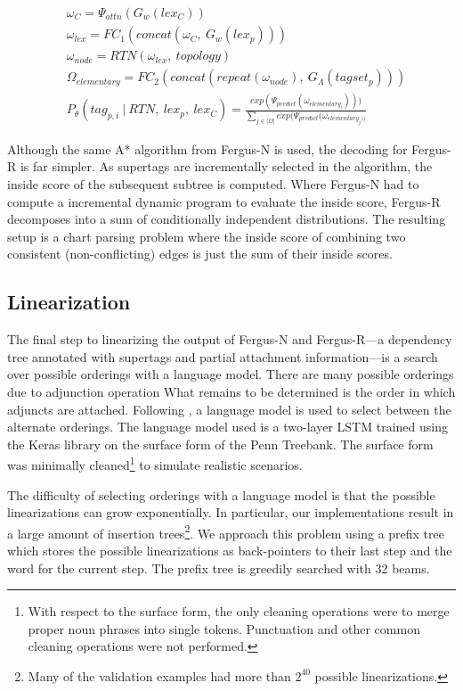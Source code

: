 \documentclass[11pt]{article}
\begin{document}
\begin{align}
&\omega_{C} = \Psi_{attn}(G_w(lex_C)) \label{eq:fergusr} \\
&\omega_{lex} = FC_1(concat(\omega_{C},~G_w(lex_p))) \nonumber \\
&\omega_{node} = RTN(\omega_{lex},~topology) \nonumber \\
&\Omega_{elementary} = FC_2(concat(repeat(\omega_{node}),~G_\Lambda(tagset_p))) \nonumber \\
&P_\theta(tag_{p,i}~|~RTN,~lex_p,~lex_{C}) = 
\frac{exp(\Psi_{predict}(\omega_{elementary_i})))}
{\sum_{j \in |\Omega|} exp(\Psi_{predict}(\omega_{elementary_j))}} \nonumber
\end{align}

Although the same A* algorithm from Fergus-N is used, the decoding for Fergus-R is far simpler.
%
As supertags are incrementally selected in the algorithm, the inside score of the subsequent subtree is computed.  
%
Where Fergus-N had to compute a incremental dynamic program to evaluate the inside score, Fergus-R decomposes into a sum of conditionally independent distributions. 
%
The resulting setup is a chart parsing problem where the inside score of combining two consistent (non-conflicting) edges is just the sum of their inside scores. 

\subsection{Linearization}

The final step to linearizing the output of Fergus-N and Fergus-R---a dependency tree annotated with supertags and partial attachment information---is a search over possible orderings with a language model. 
%
There are many possible orderings due to adjunction operation
What remains to be determined is the order in which adjuncts are attached. 
%
Following , a language model is used to select between the alternate orderings. 
%
The language model used is a two-layer LSTM trained using the Keras library on
the surface form of the Penn Treebank.
%
The surface form was minimally cleaned\footnote{With respect to the surface form, the only
cleaning operations were to merge proper noun phrases into single tokens.  Punctuation and other
common cleaning operations were not performed.} to simulate realistic scenarios.

The difficulty of selecting orderings with a language model is that the possible linearizations can grow exponentially.
%
In particular, our implementations result in a large amount of insertion trees\footnote{Many of the validation examples had more than $2^{40}$ possible linearizations.}.
%
We approach this problem using a prefix tree which stores the possible linearizations as back-pointers to their last step and the word for the current step. 
%
The prefix tree is greedily searched with 32 beams.
\end{document}
